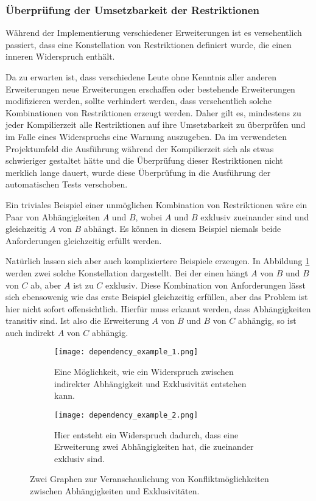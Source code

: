 \subsubsection{Überprüfung der Umsetzbarkeit der Restriktionen}
Während  der Implementierung verschiedener Erweiterungen ist es versehentlich passiert, dass eine Konstellation von Restriktionen definiert wurde, die einen inneren Widerspruch enthält.

Da zu erwarten ist, dass verschiedene Leute ohne Kenntnis aller anderen Erweiterungen neue Erweiterungen erschaffen oder bestehende Erweiterungen modifizieren werden, sollte verhindert werden, dass versehentlich solche Kombinationen von Restriktionen erzeugt werden. Daher gilt es, mindestens zu jeder Kompilierzeit alle Restriktionen auf ihre Umsetzbarkeit zu überprüfen und im Falle eines Widerspruchs eine Warnung auszugeben. Da im verwendeten Projektumfeld die Ausführung während der Kompilierzeit sich als etwas schwieriger gestaltet hätte und die Überprüfung dieser Restriktionen nicht merklich lange dauert, wurde diese Überprüfung in die Ausführung der automatischen Tests verschoben.

Ein triviales Beispiel einer unmöglichen Kombination von Restriktionen wäre ein Paar von Abhängigkeiten $A$ und $B$, wobei $A$ und $B$ exklusiv zueinander sind und gleichzeitig $A$ von $B$ abhängt. Es können in diesem Beispiel niemals beide Anforderungen gleichzeitig erfüllt werden.

Natürlich lassen sich aber auch kompliziertere Beispiele erzeugen. In Abbildung \ref{fig:impl:dependency_conflict_examples} werden zwei solche Konstellation dargestellt. Bei der einen hängt $A$ von $B$ und $B$ von $C$ ab, aber $A$ ist zu $C$ exklusiv. Diese Kombination von Anforderungen lässt sich ebensowenig wie das erste Beispiel gleichzeitig erfüllen, aber das Problem ist hier nicht sofort offensichtlich. Hierfür muss erkannt werden, dass Abhängigkeiten transitiv sind. Ist also die Erweiterung $A$ von $B$ und $B$ von $C$ abhängig, so ist auch indirekt $A$ von $C$ abhängig.

  \begin{figure}
		\centering
		\begin{subfigure}[a]{0.4\linewidth}
			\texttt{[image: dependency\_example\_1.png]}
      		\caption{Eine Möglichkeit, wie ein Widerspruch zwischen indirekter Abhängigkeit und Exklusivität entstehen kann.}
		\end{subfigure}
		\begin{subfigure}[a]{0.4\linewidth}
			\texttt{[image: dependency\_example\_2.png]}
      		\caption{Hier entsteht ein Widerspruch dadurch, dass eine Erweiterung zwei Abhängigkeiten hat, die zueinander exklusiv sind.}
		\end{subfigure}
		\caption{Zwei Graphen zur Veranschaulichung von Konfliktmöglichkeiten zwischen Abhängigkeiten und Exklusivitäten.}
		\label{fig:impl:dependency_conflict_examples}
  \end{figure}

